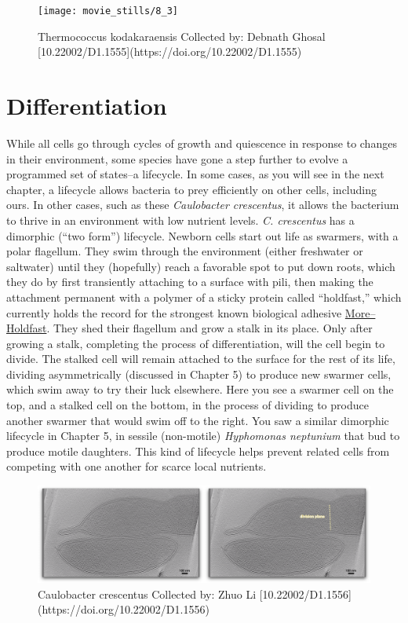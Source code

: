 \documentclass[]{tufte-book}
\begin{document}
\begin{figure}
\texttt{[image: movie\_stills/8\_3]} \caption[Thermococcus kodakaraensis Collected by]{Thermococcus kodakaraensis Collected by: Debnath Ghosal [10.22002/D1.1555](https://doi.org/10.22002/D1.1555)}\label{fig:unnamed-chunk-135}
\end{figure}

\section{Differentiation}\label{differentiation}

While all cells go through cycles of growth and quiescence in response
to changes in their environment, some species have gone a step further
to evolve a programmed set of states--a lifecycle. In some cases, as you
will see in the next chapter, a lifecycle allows bacteria to prey
efficiently on other cells, including ours. In other cases, such as
these \emph{Caulobacter crescentus}, it allows the bacterium to thrive
in an environment with low nutrient levels. \emph{C. crescentus} has a
dimorphic (``two form'') lifecycle. Newborn cells start out life as
swarmers, with a polar flagellum. They swim through the environment
(either freshwater or saltwater) until they (hopefully) reach a
favorable spot to put down roots, which they do by first transiently
attaching to a surface with pili, then making the attachment permanent
with a polymer of a sticky protein called ``holdfast,'' which currently
holds the record for the strongest known biological adhesive
\protect\hyperlink{moreholdfast}{More--Holdfast}. They shed their
flagellum and grow a stalk in its place. Only after growing a stalk,
completing the process of differentiation, will the cell begin to
divide. The stalked cell will remain attached to the surface for the
rest of its life, dividing asymmetrically (discussed in Chapter 5) to
produce new swarmer cells, which swim away to try their luck elsewhere.
Here you see a swarmer cell on the top, and a stalked cell on the
bottom, in the process of dividing to produce another swarmer that would
swim off to the right. You saw a similar dimorphic lifecycle in Chapter
5, in sessile (non-motile) \emph{Hyphomonas neptunium} that bud to
produce motile daughters. This kind of lifecycle helps prevent related
cells from competing with one another for scarce local nutrients.

\begin{figure}
\includegraphics{movie_stills/8_4} \caption[Caulobacter crescentus Collected by]{Caulobacter crescentus Collected by: Zhuo Li [10.22002/D1.1556](https://doi.org/10.22002/D1.1556)}\label{fig:unnamed-chunk-136}
\end{figure}
\end{document}
